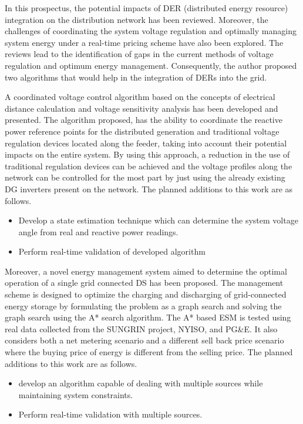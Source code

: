 In this prospectus, the potential impacts of DER (distributed energy resource) integration on the distribution network has been reviewed. Moreover, the challenges of coordinating the system voltage regulation and optimally managing system energy under a real-time pricing scheme have also been explored. The reviews lead to the identification of gaps in the current methods of voltage regulation and optimum energy management. Consequently, the author proposed two algorithms that would help in the integration of DERs into the grid.

A coordinated voltage control algorithm based on the concepts of electrical distance calculation and voltage sensitivity analysis has been developed and presented. The algorithm proposed, has the ability to coordinate the reactive power reference points for the distributed generation and traditional voltage regulation devices located along the feeder, taking into account their potential impacts on the entire system. By using this approach, a reduction in the use of traditional regulation devices can be achieved and the voltage profiles along the network can be controlled for the most part by just using the already existing DG inverters present on the network. The planned additions to this work are as follows.

\begin{itemize}
    \item Develop a state estimation technique which can determine the system voltage angle from real and reactive power readings.
    \item Perform real-time validation of developed algorithm
\end{itemize}

Moreover, a novel energy management system aimed to determine the optimal operation of a single grid connected DS has been proposed. The management scheme is designed to optimize the charging and discharging of grid-connected energy storage by formulating the problem as a graph search and solving the graph search using the A* search algorithm. The A* based ESM is tested using real data collected from the SUNGRIN project, NYISO, and PG\&E. It also considers both a net metering scenario and a different sell back price scenario where the buying price of energy is different from the selling price.  The planned additions to this work are as follows.

\begin{itemize}
    \item develop an algorithm capable of dealing with multiple sources while maintaining system constraints.
    \item Perform real-time validation with multiple sources.
\end{itemize}

